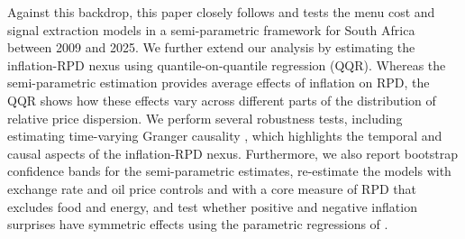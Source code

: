 \documentclass[
  letterpaper,
  DIV=11,
  numbers=noendperiod]{scrartcl}
\begin{document}
Against this backdrop, this paper closely follows \citet{caraballo2013}
and tests the menu cost and signal extraction models in a
semi-parametric framework \citep{robinson1988a} for South Africa between
2009 and 2025. We further extend our analysis by estimating the
inflation-RPD nexus using quantile-on-quantile regression (QQR). Whereas
the semi-parametric estimation provides average effects of inflation on
RPD, the QQR shows how these effects vary across different parts of the
distribution of relative price dispersion. We perform several robustness
tests, including estimating time-varying Granger causality
\citep{lu2014}, which highlights the temporal and causal aspects of the
inflation-RPD nexus. Furthermore, we also report bootstrap confidence
bands for the semi-parametric estimates, re-estimate the models with
exchange rate and oil price controls and with a core measure of RPD that
excludes food and energy, and test whether positive and negative
inflation surprises have symmetric effects using the parametric
regressions of \citet{caraballo2013}.
\end{document}
